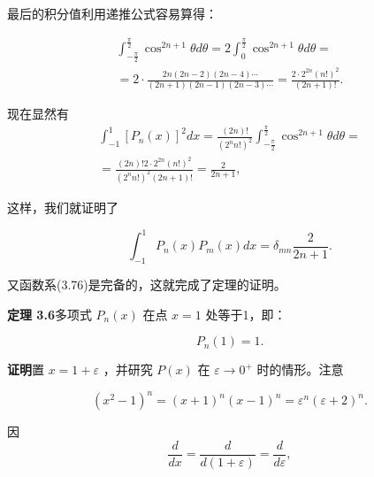 最后的积分值利用递推公式容易算得：

\begin{equation*}
\begin{array}{l} \int_ {- \frac {\pi}{2}} ^ {\frac {\pi}{2}} \cos^ {2 n + 1} \theta d \theta = 2 \int_ {0} ^ {\frac {\pi}{2}} \cos^ {2 n + 1} \theta d \theta = \\ = 2 \cdot \frac {2 n (2 n - 2) (2 n - 4) \cdots}{(2 n + 1) (2 n - 1) (2 n - 3) \cdots} = \frac {2 \cdot 2 ^ {2 n} (n !) ^ {2}}{(2 n + 1) !}. \end{array}
\end{equation*}

现在显然有
\begin{equation*}
\begin{array}{l} \int_ {- 1} ^ {1} [ P _ {n} (x) ] ^ {2} d x = \frac {(2 n) !}{(2 ^ {n} n !) ^ {2}} \int_ {- \frac {\pi}{2}} ^ {\frac {\pi}{2}} \cos^ {2 n + 1} \theta d \theta = \\ = \frac {(2 n) ! 2 \cdot 2 ^ {2 n} (n !) ^ {2}}{(2 ^ {n} n !) ^ {2} (2 n + 1) !} = \frac {2}{2 n + 1}, \end{array}
\end{equation*}

这样，我们就证明了

\begin{equation*}
\int_ {- 1} ^ {1} P _ {n} (x) P _ {m} (x) d x = \delta_ {m n} \frac {2}{2 n + 1}.
\end{equation*}

又函数系(3.76)是完备的，这就完成了定理的证明。

\textbf{定理 3.6}\quad 多项式 $P_{n}(x)$ 在点 $x = 1$ 处等于1，即：

\begin{equation*}
P _ {n} (1) = 1.\tag{3.79}
\end{equation*}

\textbf{证明}\quad 置 $x = 1 + \varepsilon$ ，并研究 $P(x)$ 在 $\varepsilon \to 0^{+}$ 时的情形。注意

\begin{equation*}
(x ^ {2} - 1) ^ {n} = (x + 1) ^ {n} (x - 1) ^ {n} = \varepsilon^ {n} (\varepsilon + 2) ^ {n}.
\end{equation*}

因
\begin{equation*}
\frac {d}{d x} = \frac {d}{d (1 + \varepsilon)} = \frac {d}{d \varepsilon},
\end{equation*}

